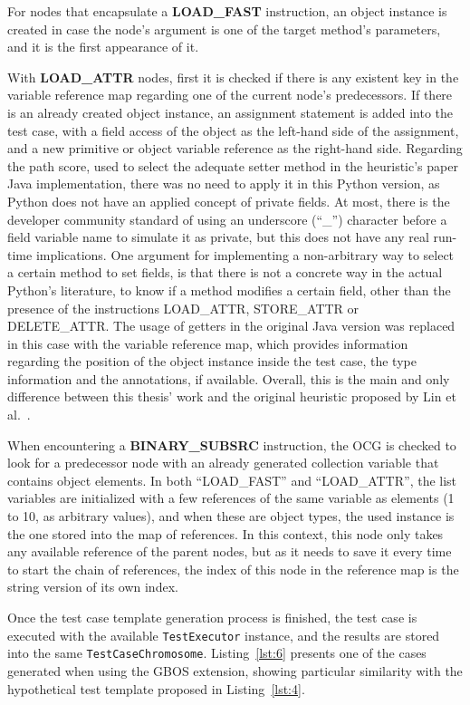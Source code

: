 \documentclass[%
  chapterprefix=false,%
  open=right,%
  twoside=true,%
  paper=a4,%
  logofile={Figures/logo.png},%
  thesistype=master,%
  UKenglish,%
]{se2thesis}
\newcommand{\classname}[1]{\texttt{#1}}
\begin{document}
For nodes that encapsulate a \textbf{LOAD\_FAST} instruction, an object instance is created in case the node's argument is one of the target method's parameters, and it is the first appearance of it.

With \textbf{LOAD\_ATTR} nodes, first it is checked if there is any existent key in the variable reference map regarding one of the current node's predecessors. 
If there is an already created object instance, an assignment statement is added into the test case, with a field access of the object as the left-hand side of the assignment, and a new primitive or object variable reference as the right-hand side.
Regarding the path score, used to select the adequate setter method in the heuristic's paper Java implementation, there was no need to apply it in this Python version, as Python does not have an applied concept of private fields.
At most, there is the developer community standard of using an underscore (``\_'') character before a field variable name to simulate it as private, but this does not have any real run-time implications.
One argument for implementing a non-arbitrary way to select a certain method to set fields, is that there is not a concrete way in the actual Python's literature, to know if a method modifies a certain field, other than the presence of the instructions LOAD\_ATTR, STORE\_ATTR or DELETE\_ATTR.\@
The usage of getters in the original Java version was replaced in this case with the variable reference map, which provides information regarding the position of the object instance inside the test case, the type information and the annotations, if available.
Overall, this is the main and only difference between this thesis' work and the original heuristic proposed by Lin et al.~\cite{DBLP:conf/sigsoft/0001O00D21}.

When encountering a \textbf{BINARY\_SUBSRC} instruction, the OCG is checked to look for a predecessor node with an already generated collection variable that contains object elements.
In both ``LOAD\_FAST'' and ``LOAD\_ATTR'', the list variables are initialized with a few references of the same variable as elements (1 to 10, as arbitrary values), and when these are object types, the used instance is the one stored into the map of references.
In this context, this node only takes any available reference of the parent nodes, but as it needs to save it every time to start the chain of references, the index of this node in the reference map is the string version of its own index.

Once the test case template generation process is finished, the test case is executed with the available \classname{TestExecutor} instance, and the results are stored into the same \classname{TestCaseChromosome}.
Listing~\ref{lst:6} presents one of the cases generated when using the GBOS extension, showing particular similarity with the hypothetical test template proposed in Listing~\ref{lst:4}.
\end{document}
